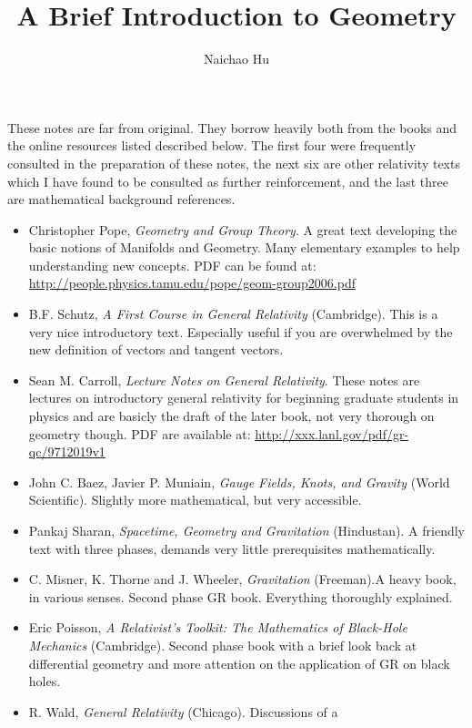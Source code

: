 \documentclass[a4paper,11pt]{article}
\title{\boldmath A Brief Introduction to Geometry}
\author{Naichao Hu}
\affiliation{Department of Physics,\\Sun Yat-sen University}
\theoremstyle{remark}
\begin{document}
 
\maketitle
\flushbottom


\clearpage

\acknowledgments
These notes are far from original. They borrow heavily both from the books 
and the online resources listed described below. 
The first four were frequently consulted in the preparation of these
notes, the next six are other relativity texts which I have found to
be consulted as further reinforcement, and the last three 
are mathematical background references.
\begin{itemize}
\item Christopher Pope, \textit{Geometry and Group Theory}. A great
  text developing the basic notions of Manifolds and Geometry. Many
  elementary examples to help understanding new concepts. PDF can be
  found at:
  \url{http://people.physics.tamu.edu/pope/geom-group2006.pdf}
\item B.F. Schutz, \textit{A First Course in General Relativity}
  (Cambridge). This is a very nice introductory text. Especially
  useful if you are overwhelmed by the new definition of vectors and
  tangent vectors.
\item Sean M. Carroll, \textit{Lecture Notes on General
    Relativity}. These notes are lectures on introductory general
  relativity for beginning graduate students in physics and are
  basicly the draft of the later book, not very thorough on geometry
  though. PDF are available at:
  \url{http://xxx.lanl.gov/pdf/gr-qc/9712019v1}  
\item John C. Baez, Javier P. Muniain, \textit{Gauge Fields, Knots,
    and Gravity} (World Scientific). Slightly more mathematical, but
  very accessible.
\item Pankaj Sharan, \textit{Spacetime, Geometry and Gravitation}
  (Hindustan). A friendly text with three phases, demands very little
  prerequisites mathematically.
\item C. Misner, K. Thorne and J. Wheeler, \textit{Gravitation}
  (Freeman).A heavy book, in various senses. Second phase GR
  book. Everything thoroughly explained.
\item Eric Poisson, \textit{A Relativist's Toolkit: The Mathematics of
    Black-Hole Mechanics} (Cambridge). Second phase book with a brief
  look back at differential geometry and more attention on the
  application of GR on black holes.
\item R. Wald, \textit{General Relativity} (Chicago). Discussions of a

\end{itemize}
\end{document}
